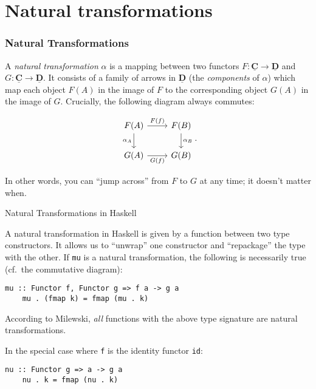 \documentclass[10pt]{beamer}
\newcommand{\Cat}[1]{\ensuremath{\underline{\mathbf{#1}}}}
\theoremstyle{definition}
\theoremstyle{remark}
\numberwithin{equation}{section}
\begin{document}
\section{Natural transformations}

\begin{frame}[fragile]
  \frametitle{Natural Transformations}

  A \emph{natural transformation} $\alpha$ is a mapping between two functors $F\colon
  \Cat{C} \rightarrow \Cat{D}$ and $G\colon \Cat{C} \rightarrow \Cat{D}$. It consists of a family of
  arrows in $\Cat{D}$ (the \emph{components} of $\alpha$) which map each object
  $F(A)$ in the image of $F$ to the corresponding object $G(A)$ in the image of
  $G$. Crucially, the following diagram always commutes:\vspace{-\baselineskip}

  \[
    \begin{tikzcd}
      F(A) \arrow[swap]{d}{\alpha_A} \arrow{r}{F(f)} & F(B) \arrow{d}{\alpha_B} \\
      G(A) \arrow[swap]{r}{G(f)} & G(B)
    \end{tikzcd}\rlap{.}
  \]

  In other words, you can ``jump across'' from $F$ to $G$ at any time; it
  doesn't matter when.
\end{frame}

\begin{frame}[fragile]{Natural Transformations in Haskell}

  A natural transformation in Haskell is given by a function between two type
  constructors. It allows us to ``unwrap'' one constructor and ``repackage'' the
  type with the other. If \lstinline{mu} is a natural transformation, the
  following is necessarily true (cf.\ the commutative diagram):
  \begin{lstlisting}[frame=single]
    mu :: Functor f, Functor g => f a -> g a
    mu . (fmap k) = fmap (mu . k)
  \end{lstlisting}

  According to Milewski, \emph{all} functions with the above type signature are
  natural transformations.

  In the special case where \lstinline{f} is the identity functor \lstinline{id}:
  
  \begin{lstlisting}[frame=single]
    nu :: Functor g => a -> g a
    nu . k = fmap (nu . k)
  \end{lstlisting}
  
\end{frame}
\end{document}
